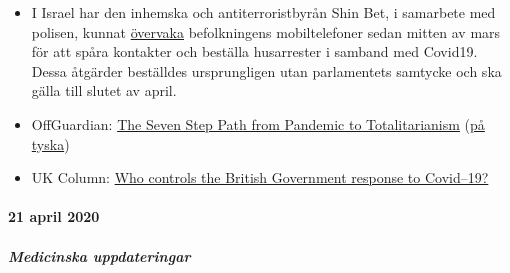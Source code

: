 \begin{itemize}
{  människor} än själva koronaviruset, när de verkställer koronaens
  utegångsförbud.
\item
  I Israel har den inhemska och antiterroristbyrån Shin Bet, i samarbete
  med polisen, kunnat
  \href{https://www.jewishpress.com/news/the-courts/state-to-high-court-even-more-shin-bet-involvement-in-fighting-the-coronavirus/2020/04/14/}{övervaka}
  befolkningens mobiltelefoner sedan mitten av mars för att spåra
  kontakter och beställa husarrester i samband med Covid19. Dessa
  åtgärder beställdes ursprungligen utan parlamentets samtycke och ska
  gälla till slutet av april.
\item
  OffGuardian:
  \href{https://off-guardian.org/2020/04/23/the-seven-step-path-from-pandemic-to-totalitarianism/}{The
  Seven Step Path from Pandemic to Totalitarianism}
  (\href{https://off-guardian.org/2020/04/23/the-seven-step-path-from-pandemic-to-totalitarianism/}{på
  tyska})
\item
  UK Column:
  \href{https://www.ukcolumn.org/article/who-controls-british-government-response-covid19-part-one}{Who
  controls the British Government response to Covid--19?}
\end{itemize}

\hypertarget{21-april-2020}{%
\paragraph{21 april 2020}\label{21-april-2020}}

\hypertarget{medicinska-uppdateringar-1}{%
\subparagraph{\texorpdfstring{\textbf{Medicinska
uppdateringar}}{Medicinska uppdateringar}}\label{medicinska-uppdateringar-1}}

